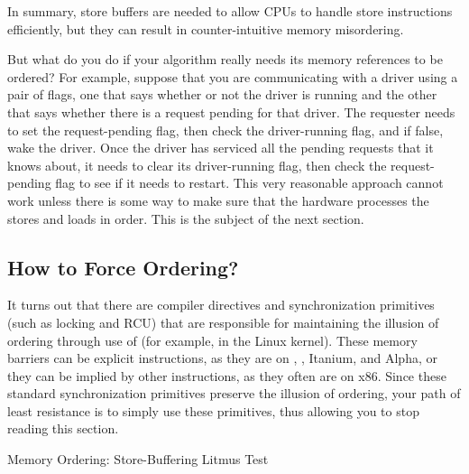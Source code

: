 \QuickQuizEnd

In summary, store buffers are needed to allow CPUs to handle
store instructions efficiently, but they can result in
counter-intuitive memory misordering.

But what do you do if your algorithm really needs its memory
references to be ordered?
For example, suppose that you are communicating with a driver using
a pair of flags, one that says whether or not the driver is running
and the other that says whether there is a request pending for that
driver.
The requester needs to set the request-pending flag, then check
the driver-running flag, and if false, wake the driver.
Once the driver has serviced all the pending requests that it knows about,
it needs to clear its driver-running flag, then check the request-pending
flag to see if it needs to restart.
This very reasonable approach cannot work unless there is some way
to make sure that the hardware processes the stores and loads in order.
This is the subject of the next section.

\subsection{How to Force Ordering?}
\label{sec:memorder:How to Force Ordering?}

It turns out that there are compiler directives and synchronization
primitives (such as locking and RCU) that are responsible for maintaining
the illusion of ordering through use of \emph{} (for
example,  in the Linux kernel).
These memory barriers can be explicit instructions, as they are on
\ARM, \Power{}, Itanium, and Alpha, or they can be implied by other instructions,
as they often are on x86.
Since these standard synchronization primitives preserve the illusion of
ordering, your path of least resistance is to simply use these primitives,
thus allowing you to stop reading this section.

\begin{listing}

\caption{Memory Ordering:
			  Store-Buffering Litmus Test}
\label{lst:memorder:Memory Ordering: Store-Buffering Litmus Test}
\end{listing}

